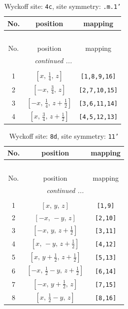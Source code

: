 \documentclass[fleqn,8pt]{jsarticle}
\begin{document}
\renewcommand{\arraystretch}{1.2}
\begin{longtable}{ccc}
\caption{Wyckoff site: {\tt 4c}, site symmetry: {\tt .m.1'}}
 \\
 \hline \hline
No. & position & mapping \\ \hline \endfirsthead

\multicolumn{2}{l}{\tablename\ \thetable{}} \\
 \hline \hline
No. & position & mapping \\ \hline \endhead

 \hline \hline
\multicolumn{2}{r}{\footnotesize\it continued ...} \\ \endfoot

 \hline \hline
\multicolumn{2}{r}{} \\ \endlastfoot

1 & $\left[ x,\, \frac{1}{4},\, z \right]$ & {\tt [1,8,9,16]} \\ \hline
2 & $\left[ - x,\, \frac{3}{4},\, z \right]$ & {\tt [2,7,10,15]} \\ \hline
3 & $\left[ - x,\, \frac{1}{4},\, z + \frac{1}{2} \right]$ & {\tt [3,6,11,14]} \\ \hline
4 & $\left[ x,\, \frac{3}{4},\, z + \frac{1}{2} \right]$ & {\tt [4,5,12,13]} \\
\end{longtable}
\renewcommand{\arraystretch}{1.2}
\begin{longtable}{ccc}
\caption{Wyckoff site: {\tt 8d}, site symmetry: {\tt 11'}}
 \\
 \hline \hline
No. & position & mapping \\ \hline \endfirsthead

\multicolumn{2}{l}{\tablename\ \thetable{}} \\
 \hline \hline
No. & position & mapping \\ \hline \endhead

 \hline \hline
\multicolumn{2}{r}{\footnotesize\it continued ...} \\ \endfoot

 \hline \hline
\multicolumn{2}{r}{} \\ \endlastfoot

1 & $\left[ x,\, y,\, z \right]$ & {\tt [1,9]} \\ \hline
2 & $\left[ - x,\, - y,\, z \right]$ & {\tt [2,10]} \\ \hline
3 & $\left[ - x,\, y,\, z + \frac{1}{2} \right]$ & {\tt [3,11]} \\ \hline
4 & $\left[ x,\, - y,\, z + \frac{1}{2} \right]$ & {\tt [4,12]} \\ \hline
5 & $\left[ x,\, y + \frac{1}{2},\, z + \frac{1}{2} \right]$ & {\tt [5,13]} \\ \hline
6 & $\left[ - x,\, \frac{1}{2} - y,\, z + \frac{1}{2} \right]$ & {\tt [6,14]} \\ \hline
7 & $\left[ - x,\, y + \frac{1}{2},\, z \right]$ & {\tt [7,15]} \\ \hline
8 & $\left[ x,\, \frac{1}{2} - y,\, z \right]$ & {\tt [8,16]} \\
\end{longtable}
\end{document}
